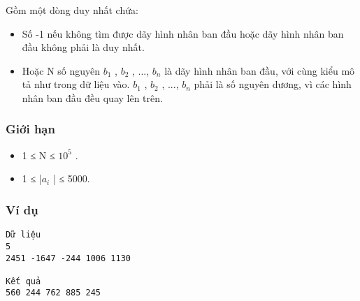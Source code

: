    Gồm một dòng duy nhất chứa:  
\begin{itemize}
	\item     Số -1 nếu không tìm được dãy hình nhân ban đầu hoặc dãy hình nhân ban đầu không phải là duy nhất.   
	\item     Hoặc N số nguyên $b_{1}$    , $b_{2}$    , ..., $b_{n}$    là dãy hình nhân ban đầu, với cùng kiểu mô tả như trong dữ liệu vào. $b_{1}$    , $b_{2}$    , ..., $b_{n}$    phải là số nguyên dương, vì các hình nhân ban đầu đều quay lên trên.   
\end{itemize}

\subsubsection{   Giới hạn  }
\begin{itemize}
	\item     1 ≤ N ≤ $10^{5}$    .   
	\item     1 ≤ |$a_{i}$    | ≤ 5000.   
\end{itemize}

\subsubsection{   Ví dụ  }
\begin{verbatim}
Dữ liệu
5
2451 -1647 -244 1006 1130

Kết quả
560 244 762 885 245	
\end{verbatim}
